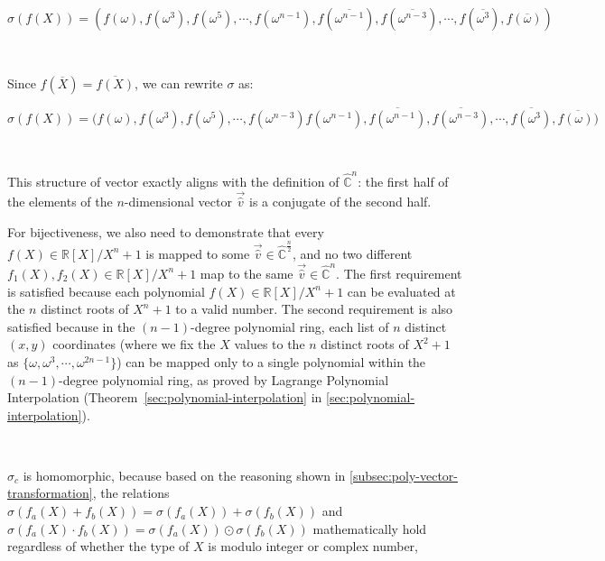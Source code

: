 $\sigma(f(X)) = (f(\omega),f(\omega^3),f(\omega^5), \cdots, f(\omega^{n-1}), f(\overline{\omega^{n-1}}), f(\overline{\omega^{n-3}}), \cdots, f(\overline{\omega^3}), f(\overline{\omega}))$

$ $

Since $f(\overline{X}) = \overline{f(X)}$, we can rewrite $\sigma$ as: 

$\sigma(f(X)) = (f(\omega),f(\omega^3),f(\omega^5), \cdots, f(\omega^{n-3}) f(\omega^{n-1}), \overline{f(\omega^{n-1})}, \overline{f(\omega^{n-3})}, \cdots, \overline{f(\omega^3)}, \overline{f(\omega))}$

$ $

This structure of vector exactly aligns with the definition of $\hat{\mathbb{C}}^n$: the first half of the elements of the $n$-dimensional vector $\vec{\hat v}$ is a conjugate of the second half.

For bijectiveness, we also need to demonstrate that every $f(X) \in \mathbb{R}[X] /X^n + 1$ is mapped to some $\vec{\hat v} \in \hat{\mathbb{C}}^{\frac{n}{2}}$, and no two different $f_1(X), f_2(X) \in \mathbb{R}[X] / X^n + 1$ map to the same $\vec{\hat v} \in \hat{\mathbb{C}}^{n}$. The first requirement is satisfied because each polynomial $f(X) \in \mathbb{R}[X] /X^n + 1$ can be evaluated at the $n$ distinct roots of $X^n + 1$ to a valid number. The second requirement is also satisfied because in the $(n-1)$-degree polynomial ring, each list of $n$ distinct $(x, y)$ coordinates (where we fix the $X$ values to the $n$ distinct roots of $X^2 + 1$ as $\{\omega, \omega^3, \cdots, \omega^{2n - 1}\}$) can be mapped only to a single polynomial within the $(n-1)$-degree polynomial ring, as proved by Lagrange Polynomial Interpolation (Theorem~\ref*{sec:polynomial-interpolation} in \autoref{sec:polynomial-interpolation}).

$ $


 $\sigma_c$ is homomorphic, because based on the reasoning shown in \autoref{subsec:poly-vector-transformation}, the relations $\sigma(f_a(X) + f_b(X)) = \sigma(f_a(X)) + \sigma(f_b(X))$ and $\sigma(f_a(X) \cdot f_b(X)) = \sigma(f_a(X)) \odot \sigma(f_b(X))$ mathematically hold regardless of whether the type of $X$ is modulo integer or complex number, 

